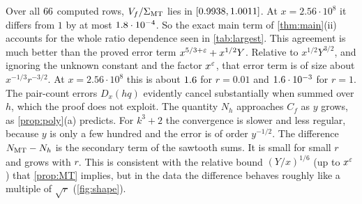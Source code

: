 \begin{table}[htbp]
\centering
\small

\caption{Exact-shape comparison: the data $N_{\mathrm{data}}=N(x,r)$, the normalised sum $N_{\MT}$ of the exact main terms, the ratio $V_f/\Sigma_{\MT}$, and the normalised $h$-average $N_h$. Rows with $r\in\{0.005,0.01,0.1,1\}$ are shown; \texttt{reproduction.json} contains all $\ShapeRows$ computed rows.}
\label{tab:shape}
\end{table}

Over all $\ShapeRows$ computed rows, $V_f/\Sigma_{\MT}$ lies in $[0.9938,1.0011]$. At $x=2.56\cdot10^8$ it differs from $1$ by at most $1.8\cdot 10^{-4}$. So the exact main term of \cref{thm:main}(ii) accounts for the whole ratio dependence seen in \cref{tab:largest}. This agreement is much better than the proved error term $x^{5/3+\varepsilon}+x^{1/2}Y$. Relative to $x^{1/2}Y^{3/2}$, and ignoring the unknown constant and the factor $x^\varepsilon$, that error term is of size about $x^{-1/3}r^{-3/2}$. At $x=2.56\cdot10^8$ this is about $1.6$ for $r=0.01$ and $1.6\cdot 10^{-3}$ for $r=1$. The pair-count errors $D_x(hq)$ evidently cancel substantially when summed over $h$, which the proof does not exploit. The quantity $N_h$ approaches $C_f$ as $y$ grows, as \cref{prop:poly}(a) predicts. For $k^3+2$ the convergence is slower and less regular, because $y$ is only a few hundred and the error is of order $y^{-1/2}$. The difference $N_{\mathrm{MT}}-N_h$ is the secondary term of the sawtooth sums. It is small for small $r$ and grows with $r$. This is consistent with the relative bound $(Y/x)^{1/6}$ (up to $x^{\varepsilon}$) that \cref{prop:MT} implies, but in the data the difference behaves roughly like a multiple of $\sqrt r$ (\cref{fig:shape}).

